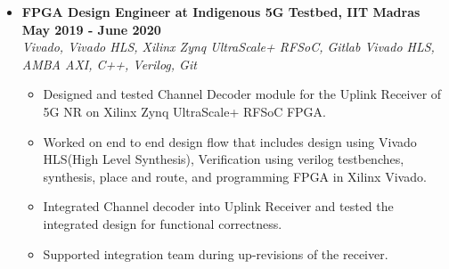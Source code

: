 \documentclass[a4paper,11pt]{article}
\newcommand{\isep}{-2 pt}
\newcommand{\spsep}{-0.75cm}
\begin{document}
\begin{itemize}
	\item \textbf{FPGA Design Engineer at Indigenous 5G Testbed, IIT Madras \hfill May 2019 - June 2020} \\
	\emph{Vivado, Vivado HLS, Xilinx Zynq UltraScale+ RFSoC, Gitlab \hfill Vivado HLS, AMBA AXI, C++, Verilog, Git} \\[\spsep]
	\begin{itemize} \itemsep \isep
		\item Designed and tested Channel Decoder module for the Uplink Receiver of 5G NR on Xilinx Zynq UltraScale+ RFSoC FPGA.
		\item Worked on end to end design flow that includes design using Vivado HLS(High Level Synthesis), Verification using verilog testbenches, synthesis, place and route, and programming FPGA in Xilinx Vivado. 
		\item Integrated Channel decoder into Uplink Receiver and tested the integrated design for functional correctness.
		\item Supported integration team during up-revisions of the receiver.
	\end{itemize}



\end{itemize}
\end{document}
